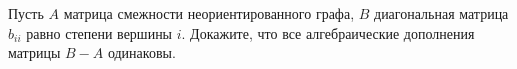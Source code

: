 Пусть $A$ матрица смежности неориентированного графа, $B$ диагональная матрица $b_{ii}$ равно степени вершины $i$. Докажите,
что все алгебраические дополнения матрицы $B - A$ одинаковы.